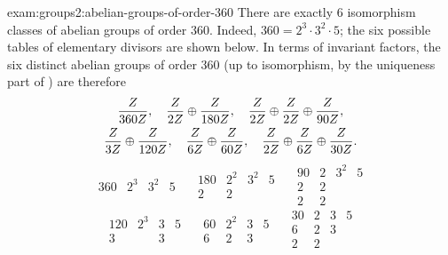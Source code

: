\begin{exam}{}{exam:groups2:abelian-groups-of-order-360}
  There are exactly $6$ isomorphism classes of abelian groups of order
  $360$. Indeed, $360 = 2^3 \cdot 3^2 \cdot 5$; the six possible
  tables of elementary divisors are shown below. In terms of invariant
  factors, the six distinct abelian groups of order $360$ (up to
  isomorphism, by the uniqueness part of ) are
  therefore
  \begin{gather*}
    \frac{Z}{360Z},\quad
    \frac{Z}{2Z} \oplus
    \frac{Z}{180Z},\quad
    \frac{Z}{2Z} \oplus
    \frac{Z}{2Z} \oplus
    \frac{Z}{90Z},\\
    \frac{Z}{3Z} \oplus
    \frac{Z}{120Z},\quad
    \frac{Z}{6Z} \oplus
    \frac{Z}{60Z},\quad
    \frac{Z}{2Z} \oplus
    \frac{Z}{6Z} \oplus
    \frac{Z}{30Z}.
  \end{gather*}
  \[
    \begin{array}{c||c|c|c}
      360 & 2^3 & 3^2 & 5
    \end{array}
    \quad
    \begin{array}{c||c|c|c}
      180 & 2^2 & 3^2 & 5 \\
      2 & 2   &     &
    \end{array}
    \quad
    \begin{array}{c||c|c|c}
      90 & 2 & 3^2 & 5 \\
      2 & 2 &     &   \\
      2 & 2 &     &
    \end{array}
  \]
  \[
    \begin{array}{c||c|c|c}
      120 & 2^3 & 3 & 5 \\
      3 &     & 3 &
    \end{array}
    \quad
    \begin{array}{c||c|c|c}
      60 & 2^2 & 3 & 5 \\
      6 & 2   & 3 &
    \end{array}
    \quad
    \begin{array}{c||c|c|c}
      30 & 2 & 3 & 5 \\
      6 & 2 & 3 &   \\
      2 & 2 &   &
    \end{array}
  \]
\end{exam}

